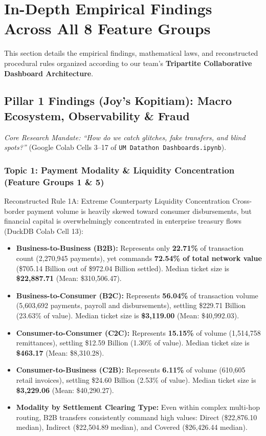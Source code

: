 \documentclass[11pt,a4paper]{article}
\begin{document}
\section{In-Depth Empirical Findings Across All 8 Feature Groups}

This section details the empirical findings, mathematical laws, and reconstructed procedural rules organized according to our team's \textbf{Tripartite Collaborative Dashboard Architecture}.

\subsection{Pillar 1 Findings (Joy's Kopitiam): Macro Ecosystem, Observability \& Fraud}
\textit{Core Research Mandate: ``How do we catch glitches, fake transfers, and blind spots?''} (Google Colab Cells 3--17 of \texttt{UM Datathon Dashboards.ipynb}).

\subsubsection{Topic 1: Payment Modality \& Liquidity Concentration (Feature Groups 1 \& 5)}
\begin{rulebox}{Reconstructed Rule 1A: Extreme Counterparty Liquidity Concentration}
Cross-border payment volume is heavily skewed toward consumer disbursements, but financial capital is overwhelmingly concentrated in enterprise treasury flows (DuckDB Colab Cell 13):
\begin{itemize}
    \item \textbf{Business-to-Business (B2B):} Represents only \textbf{22.71\%} of transaction count (2,270,945 payments), yet commands \textbf{72.54\% of total network value} (\$705.14 Billion out of \$972.04 Billion settled). Median ticket size is \textbf{\$22,887.71} (Mean: \$310,506.47).
    \item \textbf{Business-to-Consumer (B2C):} Represents \textbf{56.04\%} of transaction volume (5,603,692 payments, payroll and disbursements), settling \$229.71 Billion (23.63\% of value). Median ticket size is \textbf{\$3,119.00} (Mean: \$40,992.03).
    \item \textbf{Consumer-to-Consumer (C2C):} Represents \textbf{15.15\%} of volume (1,514,758 remittances), settling \$12.59 Billion (1.30\% of value). Median ticket size is \textbf{\$463.17} (Mean: \$8,310.28).
    \item \textbf{Consumer-to-Business (C2B):} Represents \textbf{6.11\%} of volume (610,605 retail invoices), settling \$24.60 Billion (2.53\% of value). Median ticket size is \textbf{\$3,229.06} (Mean: \$40,290.27).
    \item \textbf{Modality by Settlement Clearing Type:} Even within complex multi-hop routing, B2B transfers consistently command high values: Direct (\$22,876.10 median), Indirect (\$22,504.89 median), and Covered (\$26,426.44 median).
\end{itemize}
\end{rulebox}
\end{document}
